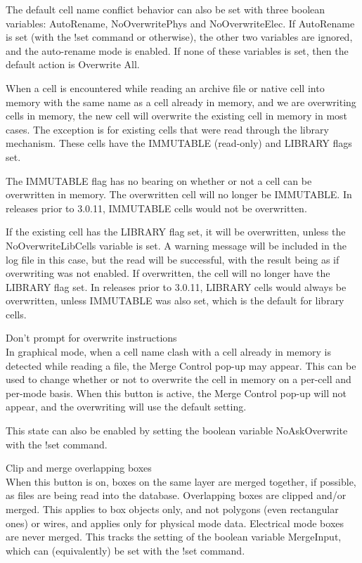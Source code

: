 \begin{description}
The default cell name conflict behavior can also be set with three
boolean variables:  {\et AutoRename}, {\et NoOverwritePhys} and {\et
NoOverwriteElec}.  If {\et AutoRename} is set (with the {\cb !set}
command or otherwise), the other two variables are ignored, and the
auto-rename mode is enabled.  If none of these variables is set, then
the default action is {\cb Overwrite All}.

When a cell is encountered while reading an archive file or native
cell into memory with the same name as a cell already in memory, and
we are overwriting cells in memory, the new cell will overwrite the
existing cell in memory in most cases.  The exception is for existing
cells that were read through the library mechanism.  These cells have
the IMMUTABLE (read-only) and LIBRARY flags set.
 
The IMMUTABLE flag has no bearing on whether or not a cell can be
overwritten in memory.  The overwritten cell will no longer be
IMMUTABLE.  In releases prior to 3.0.11, IMMUTABLE cells would not be
overwritten.

If the existing cell has the LIBRARY flag set, it will be overwritten,
unless the {\et NoOverwriteLibCells} variable is set.  A warning
message will be included in the log file in this case, but the read
will be successful, with the result being as if overwriting was not
enabled.  If overwritten, the cell will no longer have the LIBRARY
flag set.  In releases prior to 3.0.11, LIBRARY cells would always be
overwritten, unless IMMUTABLE was also set, which is the default for
library cells.

\item{\cb Don't prompt for overwrite instructions}\\
In graphical mode, when a cell name clash with a cell already in
memory is detected while reading a file, the {\cb Merge Control}
pop-up may appear.  This can be used to change whether or not to
overwrite the cell in memory on a per-cell and per-mode basis.  When
this button is active, the {\cb Merge Control} pop-up will not appear,
and the overwriting will use the default setting.

This state can also be enabled by setting the boolean variable {\et
NoAskOverwrite} with the {\cb !set} command.

\item{\cb Clip and merge overlapping boxes}\\
When this button is on, boxes on the same layer are merged together,
if possible, as files are being read into the database.  Overlapping
boxes are clipped and/or merged.  This applies to box objects only,
and not polygons (even rectangular ones) or wires, and applies only
for physical mode data.  Electrical mode boxes are never merged.  This
tracks the setting of the boolean variable {\et MergeInput}, which can
(equivalently) be set with the {\cb !set} command.


\end{description}
